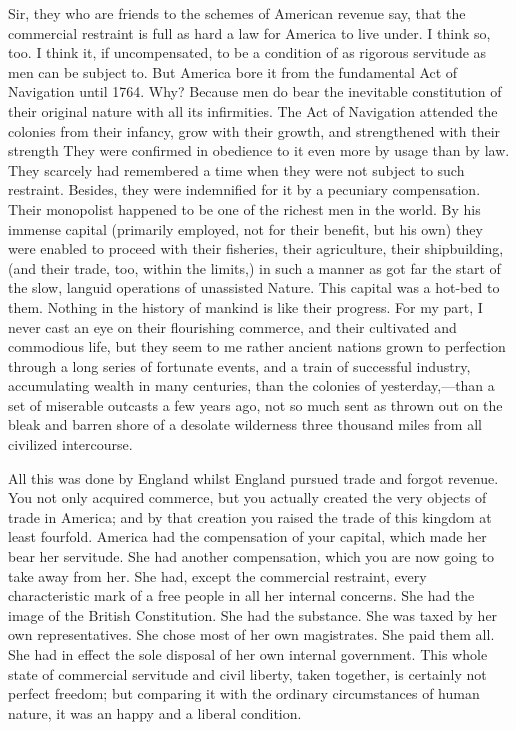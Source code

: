 Sir, they who are friends to the schemes of American revenue say, that the commercial restraint is full as hard a law for America to live under. I think so, too. I think it, if uncompensated, to be a condition of as rigorous servitude as men can be subject to. But America bore it from the fundamental Act of Navigation until 1764. Why? Because men do bear the inevitable constitution of their original nature with all its infirmities. The Act of Navigation attended the colonies from their infancy, grow with their growth, and strengthened with their strength They were confirmed in obedience to it even more by usage than by law. They scarcely had remembered a time when they were not subject to such restraint. Besides, they were indemnified for it by a pecuniary compensation. Their monopolist happened to be one of the richest men in the world. By his immense capital (primarily employed, not for their benefit, but his own) they were enabled to proceed with their fisheries, their agriculture, their shipbuilding, (and their trade, too, within the limits,) in such a manner as got far the start of the slow, languid operations of unassisted Nature. This capital was a hot-bed to them. Nothing in the history of mankind is like their progress. For my part, I never cast an eye on their flourishing commerce, and their cultivated and commodious life, but they seem to me rather ancient nations grown to perfection through a long series of fortunate events, and a train of successful industry, accumulating wealth in many centuries, than the colonies of yesterday,—than a set of miserable outcasts a few years ago, not so much sent as thrown out on the bleak and barren shore of a desolate wilderness three thousand miles from all civilized intercourse.

All this was done by England whilst England pursued trade and forgot revenue. You not only acquired commerce, but you actually created the very objects of trade in America; and by that creation you raised the trade of this kingdom at least fourfold. America had the compensation of your capital, which made her bear her servitude. She had another compensation, which you are now going to take away from her. She had, except the commercial restraint, every characteristic mark of a free people in all her internal concerns. She had the image of the British Constitution. She had the substance. She was taxed by her own representatives. She chose most of her own magistrates. She paid them all. She had in effect the sole disposal of her own internal government. This whole state of commercial servitude and civil liberty, taken together, is certainly not perfect freedom; but comparing it with the ordinary circumstances of human nature, it was an happy and a liberal condition.

